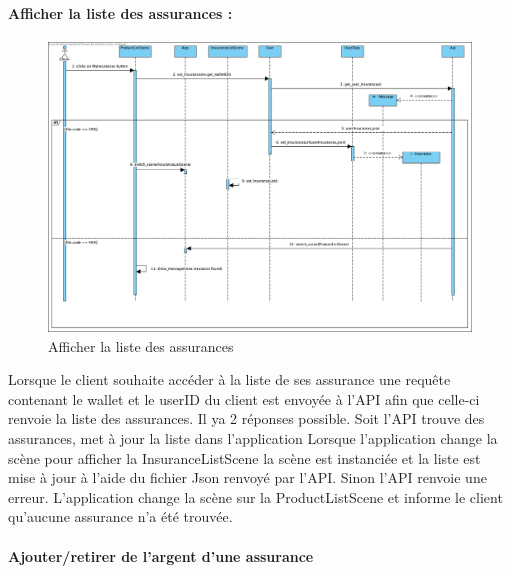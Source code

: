 \documentclass[../rapport.tex]{subfiles}
\begin{document}
				\paragraph{Afficher la liste des assurances :}
						\begin{figure}[h!]
								\centering\includegraphics[scale=0.3]{ressources/photos_diagrammes/extensionThomas/afficherListeAssurances.jpg}
								\caption{Afficher la liste des assurances}
						\end{figure}
						
					Lorsque le client souhaite accéder à la liste de ses assurance une requête contenant le wallet et le userID du client est envoyée à l'API afin 
					que celle-ci renvoie la liste des assurances. Il ya 2 réponses possible. Soit l'API trouve des assurances, met à jour la liste dans l'application
					Lorsque l'application change la scène pour afficher la InsuranceListScene la scène est instanciée et la liste est mise à jour à l'aide du fichier 
					Json renvoyé par l'API. 
					Sinon l'API renvoie une erreur. L'application change la scène sur la ProductListScene et informe le client qu'aucune assurance n'a été trouvée.
\newpage		

				\paragraph{Ajouter/retirer de l'argent d'une assurance}
\end{document}
